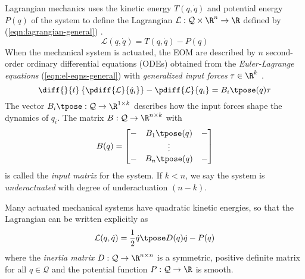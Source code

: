 Lagrangian mechanics uses the kinetic energy \(T(q,\dot{q})\) and potential
energy \(P(q)\) of the system to define the Lagrangian 
\(\mathcal{L} : \mathcal{Q}\times\R^n \rightarrow \R\) defined by
(\ref{eqn:lagrangian-general}) \cite{greenwood_dynamics}.
\begin{equation}\label{eqn:lagrangian-general}
    \mathcal{L}(q,\dot{q}) = T(q,\dot{q}) - P(q)
\end{equation}
When the mechanical system is actuated, the EOM are described by \(n\) second-order
ordinary differential equations (ODEs) obtained from the \textit{Euler-Lagrange
equations} (\ref{eqn:el-eqns-general}) with \textit{generalized input forces} 
\(\tau \in \R^k\) . 
\begin{equation}\label{eqn:el-eqns-general}
    \diff{}{t}\left\{ \pdiff{\mathcal{L}}{\dot{q}_i} \right\}
    - \pdiff{\mathcal{L}}{q_i} = B_i\tpose(q) \tau
\end{equation}
The vector \(B_i\tpose: \mathcal{Q} \rightarrow \R^{1\times k}\) describes how
the input forces shape the dynamics of \(q_i\).
The matrix  \(B: \mathcal{Q} \rightarrow \R^{n \times k}\) with
\[
    B(q) = \begin{bmatrix}
        - & B_1\tpose(q) & - \\
          & \vdots & \\
        - & B_n\tpose(q) & - \\
    \end{bmatrix}
\]
is called the \textit{input matrix} for the system.
If \(k < n\), we say the system is \textit{underactuated} with degree of
underactuation \((n - k)\).

Many actuated mechanical systems have quadratic kinetic energies, so that the
Lagrangian can be written explicitly as
\begin{equation}\label{eqn:lagrangian}
    \mathcal{L}(q,\dot{q}) = \frac{1}{2} \dot{q}\tpose D(q) \dot{q} - P(q)
\end{equation}
where the \textit{inertia matrix} \(D: \mathcal{Q} \rightarrow \R^{n\times n}\) 
is a symmetric, positive definite matrix for all \(q \in \mathcal{Q}\) and the
potential function \(P : \mathcal{Q} \rightarrow \R\) is smooth. 

